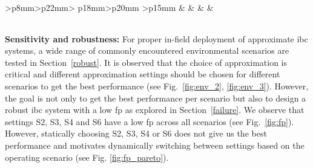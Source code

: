 \begin{table}[h]
\begin{threeparttable}
\begin{tabular}{>{\centering\arraybackslash}p{8mm}>{\centering\arraybackslash}p{22mm}>
				{\centering\arraybackslash}p{18mm}>{\centering\arraybackslash}p{20mm}
				>{\centering\arraybackslash}p{15mm}}
			 &   &  &  &  \\
			\hline \hline
		\end{tabular}
		\begin{tablenotes}[flushleft]
			\footnotesize			
			\item{}
			\item{}
			\item{}
			\item{}
			\item{}
			\item{}
		\end{tablenotes}
		\begin{tabular}{>{\centering\arraybackslash}p{86mm}}\\
 		\hline
 		\hline
 		\end{tabular}
	\end{threeparttable}
	\vspace{-5 pt}
\end{table}
\par \noindent \textbf{Sensitivity and robustness:} For proper in-field deployment of approximate \gls{ibc} systems, a wide range of commonly encountered environmental scenarios are tested in Section~\ref{robust}. It is observed that the choice of approximation is critical and different approximation settings should be chosen for different scenarios to get the best performance (see Fig.~\ref{fig:env_2}, \ref{fig:env_3}). However, the goal is not only to get the best performance per scenario but also to design a robust \gls{ibc} system with a low \gls{fp} as explored in Section~\ref{failure}. We observe that settings S2, S3, S4 and S6 have a low \gls{fp} across all scenarios (see Fig.~\ref{fig:fp}). However, statically choosing S2, S3, S4 or S6 does not give us the best performance and motivates dynamically switching between settings based on the operating scenario (see Fig. \ref{fig:fp_pareto}).
